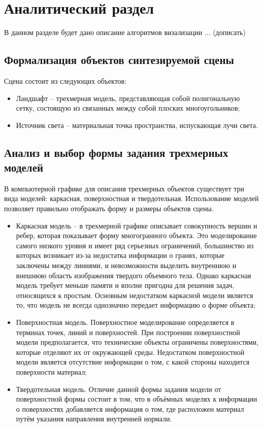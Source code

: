 \chapter{Аналитический раздел}

В данном разделе будет дано описание алгоритмов визализации ... (дописать)

\section{Формализация объектов синтезируемой сцены}

Сцена состоит из следующих объектов:

\begin{itemize}[label=--]
	\item Ландшафт -- трехмерная модель, представляющая собой полигональную сетку, состоящую из связанных между собой плоских многоугольников;
	\item Источник света -- материальная точка пространства, испускающая лучи света.
\end{itemize}

\section{Анализ и выбор формы задания трехмерных моделей}

В компьютерной графике для описания трехмерных объектов существует три вида моделей: каркасная, поверхностная и твердотельная. Использование моделей позволяет правильно отображать форму и размеры объектов сцены.

\begin{itemize}[label=--]
	\item Каркасная модель -- в трехмерной графике описывает совокупность вершин и ребер, которая показывает форму многогранного объекта. Это моделирование самого низкого уровня и имеет ряд серьезных ограничений, большинство из которых возникает из-за недостатка информации о гранях, которые заключены между линиями, и невозможности выделить внутреннюю и внешнюю область изображения твердого объемного тела. Однако каркасная модель требует меньше памяти и вполне пригодна для решения задач, относящихся к простым. Основным недостатком каркасной модели является то, что модель не всегда однозначно передает информацию о форме объекта; 
	\item Поверхностная модель. Поверхностное моделирование определяется в терминах точек, линий и поверхностей. При построении поверхностной модели предполагается, что технические объекты ограничены поверхностями, которые отделяют их от окружающей среды. Недостатком поверхностной модели является отсутствие информации о том, с какой стороны находится поверхности материал;
	\item Твердотельная модель. Отличие данной формы задания модели от поверхностной формы состоит в том, что в объёмных моделях к информации о поверхностях добавляется информация о том, где расположен материал путём указания направления внутренней нормали.
\end{itemize}

